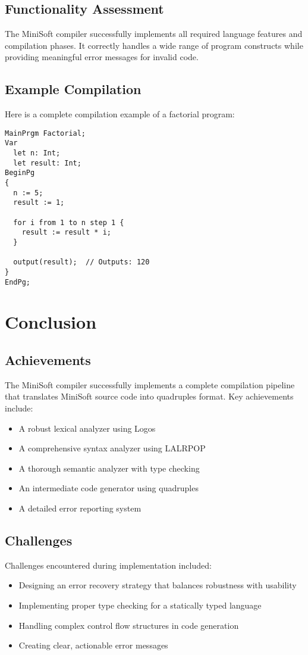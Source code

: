 \documentclass[12pt,a4paper]{article}
\begin{document}
\subsection{Functionality Assessment}
The MiniSoft compiler successfully implements all required language features and compilation phases. It correctly handles a wide range of program constructs while providing meaningful error messages for invalid code.

\subsection{Example Compilation}
Here is a complete compilation example of a factorial program:

\begin{lstlisting}[caption={Sample MiniSoft Program}]
MainPrgm Factorial;
Var
  let n: Int;
  let result: Int;
BeginPg
{
  n := 5;
  result := 1;
  
  for i from 1 to n step 1 {
    result := result * i;
  }
  
  output(result);  // Outputs: 120
}
EndPg;
\end{lstlisting}

\section{Conclusion}
\subsection{Achievements}
The MiniSoft compiler successfully implements a complete compilation pipeline that translates MiniSoft source code into  quadruples format. Key achievements include:

\begin{itemize}
	\item A robust lexical analyzer using Logos
	\item A comprehensive syntax analyzer using LALRPOP
	\item A thorough semantic analyzer with type checking
	\item An intermediate code generator using quadruples
	\item A detailed error reporting system
\end{itemize}

\subsection{Challenges}
Challenges encountered during implementation included:
\begin{itemize}
	\item Designing an error recovery strategy that balances robustness with usability
	\item Implementing proper type checking for a statically typed language
	\item Handling complex control flow structures in code generation
	\item Creating clear, actionable error messages
\end{itemize}
\end{document}
